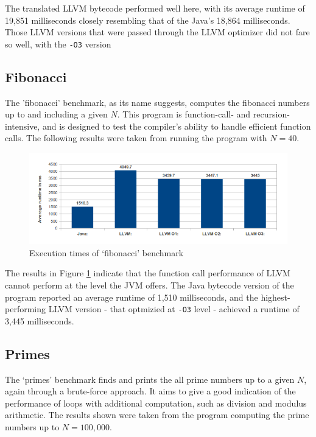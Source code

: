 The translated LLVM bytecode performed well here, with its average runtime of 19,851 milliseconds closely resembling that of the Java's 18,864 milliseconds. Those LLVM versions that were passed through the LLVM optimizer did not fare so well, with the \verb|-O3| version


\subsection*{Fibonacci}

The 'fibonacci' benchmark, as its name suggests, computes the fibonacci numbers up to and including a given $N$. This program is function-call- and recursion-intensive, and is designed to test the compiler's ability to handle efficient function calls. The following results were taken from running the program with $N = 40$.

\begin{figure}[h!]
    \centering
    \includegraphics[width=1.0\textwidth]{images/res_fibonacci.png}
    \caption{Execution times of `fibonacci' benchmark}
    \label{fig:res_fibonacci}
\end{figure}

The results in Figure \ref{fig:res_fibonacci} indicate that the function call performance of LLVM cannot perform at the level the JVM offers. The Java bytecode version of the program reported an average runtime of 1,510 milliseconds, and the highest-performing LLVM version - that optmizied at \verb|-O3| level - achieved a runtime of 3,445 milliseconds.


\subsection*{Primes}

The `primes' benchmark finds and prints the all prime numbers up to a given $N$, again through a brute-force approach. It aims to give a good indication of the performance of loops with additional computation, such as division and modulus arithmetic. The results shown were taken from the program computing the prime numbers up to $N = 100,000$.

